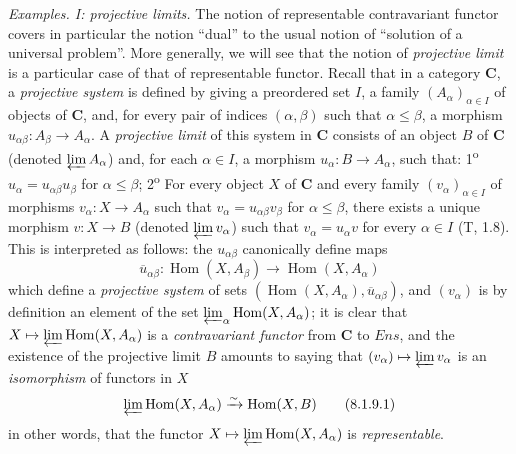 \begin{env}[8.1.9]
\label{0.8.1.9}
\textit{Examples. I: projective limits.} The notion of representable
contravariant functor covers in particular the notion ``dual'' to
the usual notion of ``solution of a
universal problem''. More generally, we will see that the notion of
\emph{projective limit} is a particular case of that of representable
functor. Recall that in a category $\boldsymbol{C}$, a \emph{projective system} is
defined by giving a preordered set $I$, a
family $(A_\alpha)_{\alpha\in I}$ of objects of $\boldsymbol{C}$, and, for every pair
of indices $(\alpha,\beta)$ such that $\alpha\leq\beta$, a morphism
$u_{\alpha\beta}:A_\beta\to A_\alpha$. A \emph{projective limit} of this
system in $\boldsymbol{C}$ consists of an object $B$ of $\boldsymbol{C}$ (denoted
$\varprojlim A_\alpha$) and, for each $\alpha\in I$, a morphism
$u_\alpha:B\to A_\alpha$, such that: 1\textsuperscript{o}
$u_\alpha=u_{\alpha\beta}u_\beta$ for $\alpha\leq\beta$;
2\textsuperscript{o} For every object $X$ of $\boldsymbol{C}$ and every family
$(v_\alpha)_{\alpha\in I}$ of morphisms $v_\alpha:X\to A_\alpha$ such
that $v_\alpha=u_{\alpha\beta}v_\beta$ for $\alpha\leq\beta$, there exists a
unique morphism $v:X\to B$ (denoted $\varprojlim v_\alpha$) such that
$v_\alpha=u_\alpha v$ for every $\alpha\in I$ (T, 1.8). This is interpreted
as follows: the $u_{\alpha\beta}$ canonically define
maps
\[
  \overline{u}_{\alpha\beta}:\operatorname{Hom}(X,A_\beta)
  \to\operatorname{Hom}(X,A_\alpha)
\]
which define a \emph{projective system} of sets
$(\operatorname{Hom}(X,A_\alpha),\overline{u}_{\alpha\beta})$, and
$(v_\alpha)$ is by definition an element of the set
$\varprojlim_\alpha\operatorname{Hom}(X,A_\alpha)$; it is clear that
$X\mapsto\varprojlim\operatorname{Hom}(X,A_\alpha)$ is a
\emph{contravariant functor} from $\boldsymbol{C}$ to $\boldsymbol{\mathit{Ens}}$, and the existence of
the projective limit $B$ amounts to saying that
$(v_\alpha)\mapsto\varprojlim v_\alpha$ is an \emph{isomorphism} of
functors in $X$
\[
  \varprojlim\operatorname{Hom}(X,A_\alpha)
  \xrightarrow{\sim}\operatorname{Hom}(X,B)
  \tag{8.1.9.1}\label{0.8.1.9.1}
\]
in other words, that the functor
$X\mapsto\varprojlim\operatorname{Hom}(X,A_\alpha)$ is
\emph{representable}.
\end{env}

